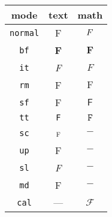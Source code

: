 \documentclass{standalone}
\begin{document}
\begin{tabular}{ccc}
\toprule
mode & text & math \\
\midrule
\verb|normal| & \textnormal{F}  & $\mathnormal{F}$ \\
\verb|bf|     & \textbf{F}      & $\mathbf{F}$     \\
\verb|it|     & \textit{F}      & $\mathit{F}$     \\
\verb|rm|     & \textrm{F}      & $\mathrm{F}$     \\
\verb|sf|     & \textsf{F}      & $\mathsf{F}$     \\
\verb|tt|     & \texttt{F}      & $\mathtt{F}$     \\
\verb|sc|     & \textsc{f}      & $-$              \\
\verb|up|     & \textup{F}      & $-$              \\
\verb|sl|     & \textsl{F}      & $-$              \\
\verb|md|     & \textmd{F}      & $-$              \\
\verb|cal|    & ---             & $\mathcal{F}$    \\
\bottomrule
\end{tabular}

\end{document}
